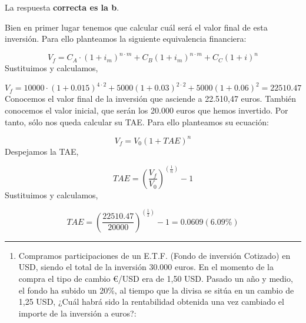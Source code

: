 \documentclass[
  letterpaper,
  DIV=11,
  numbers=noendperiod]{scrreprt}
\providecommand{\tightlist}{%
  \setlength{\itemsep}{0pt}\setlength{\parskip}{0pt}}\usepackage{longtable,booktabs,array}
\begin{document}
\begin{tcolorbox}[enhanced jigsaw, left=2mm, opacityback=0, colback=white, breakable, arc=.35mm, bottomrule=.15mm, rightrule=.15mm, toprule=.15mm, leftrule=.75mm, colframe=quarto-callout-tip-color-frame]
\begin{minipage}[t]{5.5mm}
\textcolor{quarto-callout-tip-color}{\faLightbulb}
\end{minipage}%
\begin{minipage}[t]{\textwidth - 5.5mm}

La respuesta \textbf{correcta es la b}.

Bien en primer lugar tenemos que calcular cuál será el valor final de
esta inversión. Para ello planteamos la siguiente equivalencia
financiera:

\[V_f=C_A\cdot\left(1+i_m\right)^{n\cdot m}+C_B\left(1+i_m\right)^{n\cdot m}+C_C\left(1+i\right)^{n}\]
Sustituimos y calculamos,

\[V_f=10000\cdot\left(1+0.015\right)^{4\cdot 2}+5000\left(1+0.03\right)^{2\cdot 2}+5000\left(1+0.06\right)^{2}=22510.47\]
Conocemos el valor final de la inversión que asciende a 22.510,47 euros.
También conocemos el valor inicial, que serán los 20.000 euros que hemos
invertido. Por tanto, sólo nos queda calcular su TAE. Para ello
planteamos su ecuación:

\[V_f=V_0\left(1+TAE\right)^n\] Despejamos la TAE,

\[TAE=\left(\frac{V_f}{V_0}\right)^{\left(\frac{1}{n}\right)}-1\]
Sustituimos y calculamos,

\[TAE=\left(\frac{22510.47}{20000}\right)^{\left(\frac{1}{2}\right)}-1=0.0609(6.09\%)\]

\end{minipage}%
\end{tcolorbox}

\begin{center}\rule{0.5\linewidth}{0.5pt}\end{center}

\begin{enumerate}
\def\labelenumi{\arabic{enumi}.}
\setcounter{enumi}{68}
\tightlist
\item
  Compramos participaciones de un E.T.F. (Fondo de inversión Cotizado)
  en USD, siendo el total de la inversión 30.000 euros. En el momento de
  la compra el tipo de cambio €/USD era de 1,50 USD. Pasado un año y
  medio, el fondo ha subido un 20\%, al tiempo que la divisa se sitúa en
  un cambio de 1,25 USD, ¿Cuál habrá sido la rentabilidad obtenida una
  vez cambiado el importe de la inversión a euros?:
\end{enumerate}
\end{document}
